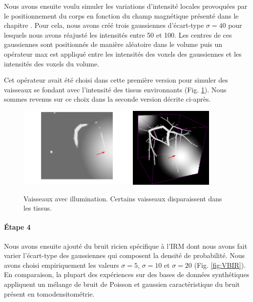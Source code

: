 Nous avons ensuite voulu simuler les variations d'intensité locales provoquées par le positionnement du corps en fonction du champ magnétique présenté dans le chapitre \chapContextN{}. Pour cela, nous avons créé trois gaussiennes d'écart-type $\sigma=40$ pour lesquels nous avons réajusté les intensités entre 50 et 100. Les centres de ces gaussiennes sont positionnés de manière aléatoire dans le volume puis un opérateur max est appliqué entre les intensités des voxels des gaussiennes et les intensités des voxels du volume.

Cet opérateur avait été choisi dans cette première version pour simuler des vaisseaux se fondant avec l'intensité des tissus environnants (Fig. \ref{fig:VBI}). Nous sommes revenus sur ce choix dans la seconde version décrite ci-après.

\begin{figure}[!ht]
  \centering
  \includegraphics[height=4cm]{Images/2D_VBI.png}
  \includegraphics[height=4cm]{Images/3D_VBI.png}
  
  \caption{Vaisseaux avec illumination. Certains vaisseaux disparaissent dans les tissus.}
  \label{fig:VBI}
\end{figure}

\paragraph{Étape 4}

Nous avons ensuite ajouté du bruit ricien spécifique à l'IRM dont nous avons fait varier l'écart-type des gaussiennes qui composent la densité de probabilité. Nous avons choisi empiriquement les valeurs $\sigma=5$, $\sigma=10$ et $\sigma=20$ (Fig. \ref{fig:VBIR}). En comparaison, la plupart des expériences sur des bases de données synthétiques appliquent un mélange de bruit de Poisson et gaussien caractéristique du bruit présent en tomodensitométrie.

